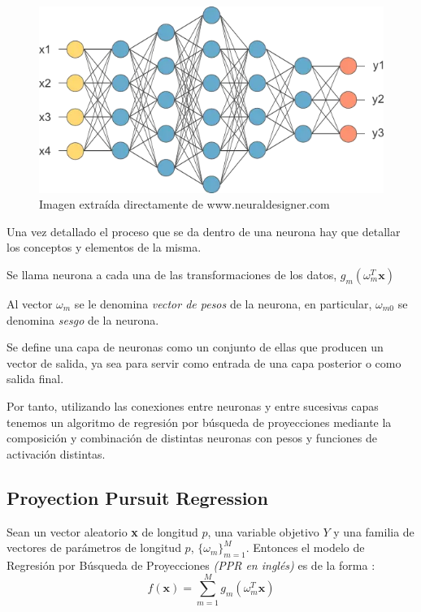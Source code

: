 \begin{figure}[h]
\centering
\includegraphics[scale=0.45]{Documentos Extra/red-neuronal-grande.png}
\caption{Imagen extraída directamente de www.neuraldesigner.com}
\end{figure}

\noindent Una vez detallado el proceso que se da dentro de una neurona hay que detallar los conceptos y elementos de la misma.

\begin{defi}
Se llama neurona a cada una de las transformaciones de los datos,  $g_m(\omega_m^T \textbf{x})$
\end{defi}
\begin{defi}
Al vector $\omega_m$ se le denomina \textit{vector de pesos} de la neurona, en particular, $\omega_{m0}$ se denomina \textit{sesgo} de la neurona. 
\end{defi}
\begin{defi}
Se define una capa de neuronas como un conjunto de ellas que producen un vector de salida, ya sea para servir como entrada de una capa posterior o como salida final. 
\end{defi}

\noindent Por tanto, utilizando las conexiones entre neuronas y entre sucesivas capas tenemos un algoritmo de regresión por búsqueda de proyecciones mediante la composición y combinación de distintas neuronas con pesos y funciones de activación distintas. 

\subsection{Proyection Pursuit Regression}

\noindent Sean un vector aleatorio \textbf{x} de longitud $p$, una variable objetivo $Y$ y una familia de vectores de parámetros de longitud $p$, $\lbrace \omega_m\rbrace_{m=1}^M$. Entonces el modelo de Regresión por Búsqueda de Proyecciones \textit{(PPR en inglés)} es de la forma :
\begin{equation}
f(\textbf{x})=\sum_{m=1}^M g_m(\omega_m^T \textbf{x})
\end{equation}

